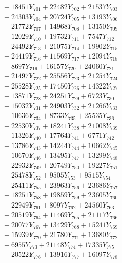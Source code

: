 \documentclass[a4paper,10pt]{article}
\begin{document}
{\begin{align}
&\;  + 18451 Y_{701} + 22482 Y_{702} + 21537 Y_{703} \\[0.3ex]
&\;  + 24303 Y_{704} + 20724 Y_{705} + 13193 Y_{706} \\[0.3ex]
&\;  + 21772 Y_{707} + 14968 Y_{708} + 13150 Y_{709} \\[0.3ex]
&\;  + 12029 Y_{710} + 19732 Y_{711} + 7547 Y_{712} \\[0.3ex]
&\;  + 24492 Y_{713} + 21075 Y_{714} + 19902 Y_{715} \\[0.3ex]
&\;  + 24419 Y_{716} + 11569 Y_{717} + 12094 Y_{718} \\[0.5ex]\allowbreak
&\;  + 8697 Y_{719} + 16157 Y_{720} + 24060 Y_{721} \\[0.3ex]
&\;  + 21497 Y_{722} + 25556 Y_{723} + 21254 Y_{724} \\[0.3ex]
&\;  + 25528 Y_{725} + 17450 Y_{726} + 14322 Y_{727} \\[0.3ex]
&\;  + 13871 Y_{728} + 24251 Y_{729} + 6723 Y_{730} \\[0.3ex]
&\;  + 15032 Y_{731} + 24903 Y_{732} + 21266 Y_{733} \\[0.3ex]
&\;  + 10636 Y_{734} + 8733 Y_{735} + 25535 Y_{736} \\[0.3ex]
&\;  + 22530 Y_{737} + 18241 Y_{738} + 21008 Y_{739} \\[0.3ex]
&\;  + 11326 Y_{740} + 17764 Y_{741} + 6771 Y_{742} \\[0.3ex]
&\;  + 13786 Y_{743} + 14244 Y_{744} + 10662 Y_{745} \\[0.3ex]
&\;  + 10670 Y_{746} + 13495 Y_{747} + 13299 Y_{748} \\[0.5ex]\allowbreak
&\;  + 22932 Y_{749} + 20749 Y_{750} + 19227 Y_{751} \\[0.3ex]
&\;  + 25478 Y_{752} + 9505 Y_{753} + 9515 Y_{754} \\[0.3ex]
&\;  + 25411 Y_{755} + 23963 Y_{756} + 23686 Y_{757} \\[0.3ex]
&\;  + 18251 Y_{758} + 19859 Y_{759} + 23605 Y_{760} \\[0.3ex]
&\;  + 22949 Y_{761} + 8097 Y_{762} + 24560 Y_{763} \\[0.3ex]
&\;  + 20519 Y_{764} + 11469 Y_{765} + 21117 Y_{766} \\[0.3ex]
&\;  + 20077 Y_{767} + 13429 Y_{768} + 15241 Y_{769} \\[0.3ex]
&\;  + 15939 Y_{770} + 21780 Y_{771} + 13680 Y_{772} \\[0.3ex]
&\;  + 6955 Y_{773} + 21148 Y_{774} + 17335 Y_{775} \\[0.3ex]
&\;  + 20522 Y_{776} + 13916 Y_{777} + 16097 Y_{778} \\[0.5ex]\allowbreak

\end{align}}
\end{document}
